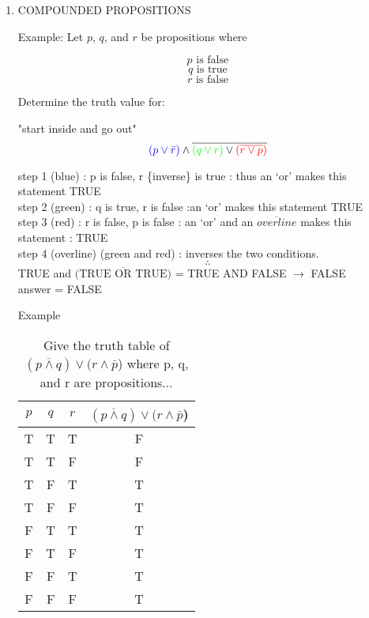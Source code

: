 \documentclass[10pt,letterpaper]{article}
\begin{document}
{

\begin{enumerate}
    \item[]
    \begin{center}
            COMPOUNDED PROPOSITIONS
    \end{center}
    \vspace{1.0em}
    
    Example: Let $p$, $q$, and $r$ be propositions where
    
    $$p \text{ is false}$$
    $$q \text{ is true}$$
    $$r \text{ is false}$$
    
    Determine the truth value for:
    
        \quad "start inside and go out"
    \vspace{1em}
    $$ \textcolor{blue}{( p \vee \bar{r} )} \wedge \overline{ \textcolor{green}{( q \vee r )} \vee \textcolor{red}{( \overline{r \vee p })}} $$
    
    \begin{center}
        step 1 (blue) : p is false, r \{inverse\} is true : thus an `or' makes this statement \quad TRUE\\
        step 2 (green) : q is true, r is false :an `or' makes this statement \quad TRUE\\
        step 3 (red) : r is false, p is false : an `or' and an $\overline{overline}$ makes this statement : TRUE \\
        step 4 (overline) (green and red) : inverses the two conditions.
        $$\therefore$$ TRUE and $\overline{ \text{(TRUE OR TRUE)}}$ = TRUE AND FALSE $\rightarrow${ FALSE }\\
        answer = FALSE \checkmark\\
    \end{center}
    \hrulefill
    \begin{center}
    Example 
    \begin{table}[h!]
    \caption*{Give the truth table of $(\overline{p \wedge q}) \vee (r \wedge \bar{p}$) where p, q, and r are propositions...}
        \centering
    \label{}
    \begin{tabular}{c|c|c|c} %
      $p$ & $q$ & $r$ & $(\overline{p \wedge q}) \vee (r \wedge \bar{p}$)    \\
      \hline
    T & T & T & F \\
    T & T & F & F \\
    T & F & T & T \\
    T & F & F & T \\
    \hline
    F & T & T & T \\
    F & T & F & T \\
    F & F & T & T \\
    F & F & F & T \\
    

\end{tabular}
\end{table}
\end{center}
\end{enumerate}}
\end{document}
